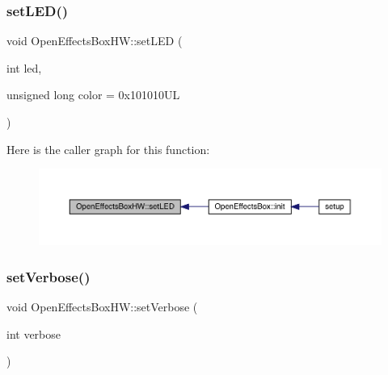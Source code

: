 \subsubsection{\texorpdfstring{set\+L\+E\+D()}{setLED()}}
{\footnotesize\ttfamily void Open\+Effects\+Box\+H\+W\+::set\+L\+ED (\begin{DoxyParamCaption}\item[{int}]{led,  }\item[{unsigned long}]{color = {\ttfamily 0x101010UL} }\end{DoxyParamCaption})}

Here is the caller graph for this function\+:\nopagebreak
\begin{figure}[H]
\begin{center}
\leavevmode
\includegraphics[width=350pt]{class_open_effects_box_h_w_a8bb57e4e28ba7012045ce7adaa15b78b_icgraph}
\end{center}
\end{figure}
\mbox{\label{class_open_effects_box_h_w_a23264e9f5d39eab721501b5a2bd3b190}} 
\subsubsection{\texorpdfstring{set\+Verbose()}{setVerbose()}}
{\footnotesize\ttfamily void Open\+Effects\+Box\+H\+W\+::set\+Verbose (\begin{DoxyParamCaption}\item[{int}]{verbose }\end{DoxyParamCaption})}

\mbox{\label{class_open_effects_box_h_w_a9313d16771542c43c7782c19046caa8d}} 
